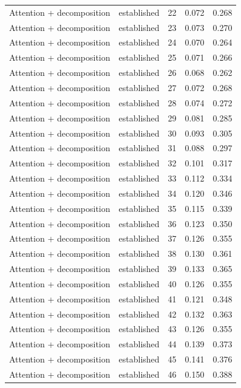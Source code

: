 \begin{tabular}{llrrr}
Attention + decomposition & established & 22 & 0.072 & 0.268 \\
Attention + decomposition & established & 23 & 0.073 & 0.270 \\
Attention + decomposition & established & 24 & 0.070 & 0.264 \\
Attention + decomposition & established & 25 & 0.071 & 0.266 \\
Attention + decomposition & established & 26 & 0.068 & 0.262 \\
Attention + decomposition & established & 27 & 0.072 & 0.268 \\
Attention + decomposition & established & 28 & 0.074 & 0.272 \\
Attention + decomposition & established & 29 & 0.081 & 0.285 \\
Attention + decomposition & established & 30 & 0.093 & 0.305 \\
Attention + decomposition & established & 31 & 0.088 & 0.297 \\
Attention + decomposition & established & 32 & 0.101 & 0.317 \\
Attention + decomposition & established & 33 & 0.112 & 0.334 \\
Attention + decomposition & established & 34 & 0.120 & 0.346 \\
Attention + decomposition & established & 35 & 0.115 & 0.339 \\
Attention + decomposition & established & 36 & 0.123 & 0.350 \\
Attention + decomposition & established & 37 & 0.126 & 0.355 \\
Attention + decomposition & established & 38 & 0.130 & 0.361 \\
Attention + decomposition & established & 39 & 0.133 & 0.365 \\
Attention + decomposition & established & 40 & 0.126 & 0.355 \\
Attention + decomposition & established & 41 & 0.121 & 0.348 \\
Attention + decomposition & established & 42 & 0.132 & 0.363 \\
Attention + decomposition & established & 43 & 0.126 & 0.355 \\
Attention + decomposition & established & 44 & 0.139 & 0.373 \\
Attention + decomposition & established & 45 & 0.141 & 0.376 \\
Attention + decomposition & established & 46 & 0.150 & 0.388 \\

\end{tabular}
